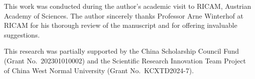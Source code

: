 \documentclass[10pt,reqno]{amsart}
\theoremstyle{definition}
\theoremstyle{remark}
\numberwithin{equation}{section}
\begin{document}
This work was conducted during the author’s academic visit to RICAM, Austrian Academy of Sciences. The author sincerely thanks Professor Arne Winterhof at RICAM for his thorough review of the manuscript and for offering invaluable suggestions.

This research was partially supported by the China Scholarship Council Fund (Grant No.\ 202301010002) and the Scientific Research Innovation Team Project of China West Normal University (Grant No.\ KCXTD2024-7).












%
\end{document}
